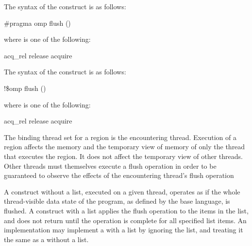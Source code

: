 \syntax
\begin{ccppspecific}
The syntax of the  construct is as follows:

\begin{boxedcode}
\#pragma omp flush  \plc{[}()\plc{] new-line}
\end{boxedcode}
\begin{samepage}
where  is one of the following:

\begin{indentedcodelist}
acq\_rel
release
acquire
\end{indentedcodelist}
\end{samepage}
\end{ccppspecific}

\begin{fortranspecific}
The syntax of the  construct is as follows:

\begin{boxedcode}
!\$omp flush  \plc{[}()\plc{]}
\end{boxedcode}
\begin{samepage}
where  is one of the following:

\begin{indentedcodelist}
acq\_rel
release
acquire
\end{indentedcodelist}
\end{samepage}
\end{fortranspecific}

\binding
The binding thread set for a  region is the encountering thread. Execution of a 
 region affects the memory and the temporary view of memory of only the thread 
that executes the region. It does not affect the temporary view of other threads. Other 
threads must themselves execute a flush operation in order to be guaranteed to observe 
the effects of the encountering thread’s flush operation

\descr
A  construct without a list, executed on a given thread, operates as if the whole 
thread-visible data state of the program, as defined by the base language, is flushed. A 
 construct with a list applies the flush operation to the items in the list, and does 
not return until the operation is complete for all specified list items. An implementation 
may implement a  with a list by ignoring the list, and treating it the same as a 
 without a list.

